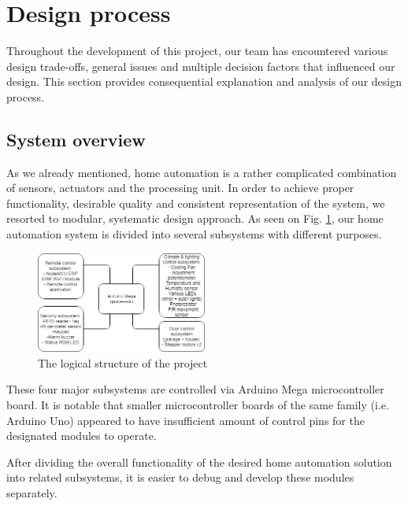 \documentclass[journal,onecolumn]{IEEEtran}
\begin{document}
\section{Design process}

Throughout the development of this project, our team has encountered various design trade-offs, general issues and multiple decision factors that influenced our design. This section provides consequential explanation and analysis of our design process.

\subsection{System overview}

As we already mentioned, home automation is a rather complicated combination of sensors, actuators and the processing unit. In order to achieve proper functionality, desirable quality and consistent representation of the system, we resorted to modular, systematic design approach. As seen on Fig. \ref{fig:img2}, our home automation system is divided into several subsystems with different purposes.

\begin{figure}[H]
  \includegraphics[width=0.5\textwidth]{img/img2.png}
  \caption{The logical structure of the project}
  \label{fig:img2}
\end{figure}

These four major subsystems are controlled via Arduino Mega microcontroller board. It is notable that smaller microcontroller boards of the same family (i.e. Arduino Uno) appeared to have insufficient amount of control pins for the designated modules to operate. 

After dividing the overall functionality of the desired home automation solution into related subsystems, it is easier to debug and develop these modules separately. 
\end{document}
